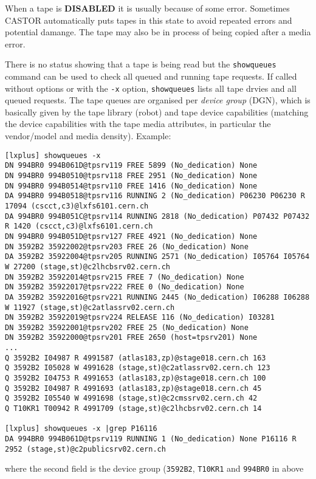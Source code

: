 When a tape is {\bf DISABLED} it is usually because of some error. Sometimes CASTOR automatically
puts tapes in this state to avoid repeated errors and potential damange. The tape may also be
in process of being copied after a media error.

There is no status showing that a tape is being read but the {\tt showqueues} command can be used
to check all queued and running tape requests. If called without options or with the {\tt -x}
option, {\tt showqueues} lists all tape drvies and all queued requests. The tape queues are
organised per {\em device group} (DGN), which is basically given by the tape library (robot) and
tape device capabilities (matching the device capabilities with the tape media attributes, in 
particular the vendor/model and media density). Example:
\small
\begin{verbatim}
[lxplus] showqueues -x
DN 994BR0 994B061D@tpsrv119 FREE 5899 (No_dedication) None
DN 994BR0 994B0510@tpsrv118 FREE 2951 (No_dedication) None
DN 994BR0 994B0514@tpsrv110 FREE 1416 (No_dedication) None
DA 994BR0 994B0518@tpsrv116 RUNNING 2 (No_dedication) P06230 P06230 R 17094 (cscct,c3)@lxfs6101.cern.ch
DA 994BR0 994B051C@tpsrv114 RUNNING 2818 (No_dedication) P07432 P07432 R 1420 (cscct,c3)@lxfs6101.cern.ch
DN 994BR0 994B051D@tpsrv127 FREE 4921 (No_dedication) None
DN 3592B2 35922002@tpsrv203 FREE 26 (No_dedication) None
DA 3592B2 35922004@tpsrv205 RUNNING 2571 (No_dedication) I05764 I05764 W 27200 (stage,st)@c2lhcbsrv02.cern.ch
DN 3592B2 35922014@tpsrv215 FREE 7 (No_dedication) None
DN 3592B2 35922017@tpsrv222 FREE 0 (No_dedication) None
DA 3592B2 35922016@tpsrv221 RUNNING 2445 (No_dedication) I06288 I06288 W 11927 (stage,st)@c2atlassrv02.cern.ch
DN 3592B2 35922019@tpsrv224 RELEASE 116 (No_dedication) I03281
DN 3592B2 35922001@tpsrv202 FREE 25 (No_dedication) None
DN 3592B2 35922000@tpsrv201 FREE 2650 (host=tpsrv201) None
...
Q 3592B2 I04987 R 4991587 (atlas183,zp)@stage018.cern.ch 163
Q 3592B2 I05028 W 4991628 (stage,st)@c2atlassrv02.cern.ch 123
Q 3592B2 I04753 R 4991653 (atlas183,zp)@stage018.cern.ch 100
Q 3592B2 I04987 R 4991693 (atlas183,zp)@stage018.cern.ch 45
Q 3592B2 I05540 W 4991698 (stage,st)@c2cmssrv02.cern.ch 42
Q T10KR1 T00942 R 4991709 (stage,st)@c2lhcbsrv02.cern.ch 14

[lxplus] showqueues -x |grep P16116
DA 994BR0 994B061D@tpsrv119 RUNNING 1 (No_dedication) None P16116 R 2952 (stage,st)@c2publicsrv02.cern.ch
\end{verbatim}
\normalsize
where the second field is the device group ({\tt 3592B2}, {\tt T10KR1} and {\tt 994BR0} in above
